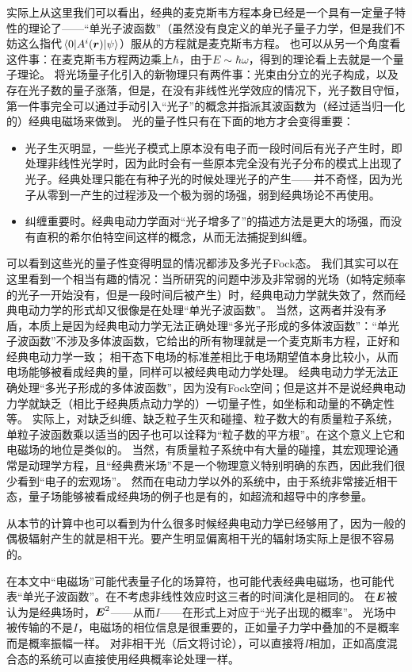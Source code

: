 实际上从这里我们可以看出，经典的麦克斯韦方程本身已经是一个具有一定量子特性的理论了——“单光子波函数”（虽然没有良定义的单光子量子力学，但是我们不妨这么指代$\mel*{0}{A^i(\vb*{r})}{\psi}$）服从的方程就是麦克斯韦方程。
也可以从另一个角度看这件事：在麦克斯韦方程两边乘上$\hbar$，由于$E \sim \hbar \omega$，得到的理论看上去就是一个量子理论。
将光场量子化引入的新物理只有两件事：光束由分立的光子构成，以及存在光子数的量子涨落，但是，在没有非线性光学效应的情况下，光子数目守恒，第一件事完全可以通过手动引入“光子”的概念并指派其波函数为（经过适当归一化的）经典电磁场来做到。
光的量子性只有在下面的地方才会变得重要：
\begin{itemize}
    \item 光子生灭明显，一些光子模式上原本没有电子而一段时间后有光子产生时，即处理非线性光学时，因为此时会有一些原本完全没有光子分布的模式上出现了光子。经典处理只能在有种子光的时候处理光子的产生——并不奇怪，因为光子从零到一产生的过程涉及一个极为弱的场强，弱到经典场论不再使用。
    \item 纠缠重要时。经典电动力学面对“光子增多了”的描述方法是更大的场强，而没有直积的希尔伯特空间这样的概念，从而无法捕捉到纠缠。
\end{itemize}
可以看到这些光的量子性变得明显的情况都涉及多光子Fock态。
我们其实可以在这里看到一个相当有趣的情况：当所研究的问题中涉及非常弱的光场（如特定频率的光子一开始没有，但是一段时间后被产生）时，经典电动力学就失效了，然而经典电动力学的形式却又很像是在处理“单光子波函数”。
当然，这两者并没有矛盾，本质上是因为经典电动力学无法正确处理“多光子形成的多体波函数”：“单光子波函数”不涉及多体波函数，它给出的所有物理就是一个麦克斯韦方程，正好和经典电动力学一致；
相干态下电场的标准差相比于电场期望值本身比较小，从而电场能够被看成经典的量，同样可以被经典电动力学处理。
经典电动力学无法正确处理“多光子形成的多体波函数”，因为没有Fock空间；但是这并不是说经典电动力学就缺乏（相比于经典质点动力学的）一切量子性，如坐标和动量的不确定性等。
实际上，对缺乏纠缠、缺乏粒子生灭和碰撞、粒子数大的有质量粒子系统，单粒子波函数乘以适当的因子也可以诠释为“粒子数的平方根”。在这个意义上它和电磁场的地位是类似的。
当然，有质量粒子系统中有大量的碰撞，其宏观理论通常是动理学方程，且“经典费米场”不是一个物理意义特别明确的东西，因此我们很少看到“电子的宏观场”。
然而在电动力学以外的系统中，由于系统非常接近相干态，量子场能够被看成经典场的例子也是有的，如超流和超导中的序参量。

从本节的计算中也可以看到为什么很多时候经典电动力学已经够用了，因为一般的偶极辐射产生的就是相干光。要产生明显偏离相干光的辐射场实际上是很不容易的。

在本文中“电磁场”可能代表量子化的场算符，也可能代表经典电磁场，也可能代表“单光子波函数”。在不考虑非线性效应时这三者的时间演化是相同的。
在$\vb*{E}$被认为是经典场时，$\vb*{E}^2$——从而$I$——在形式上对应于“光子出现的概率”。
光场中被传输的不是$I$，电磁场的相位信息是很重要的，正如量子力学中叠加的不是概率而是概率振幅一样。
对非相干光（后文将讨论），可以直接将$I$相加，正如高度混合态的系统可以直接使用经典概率论处理一样。
